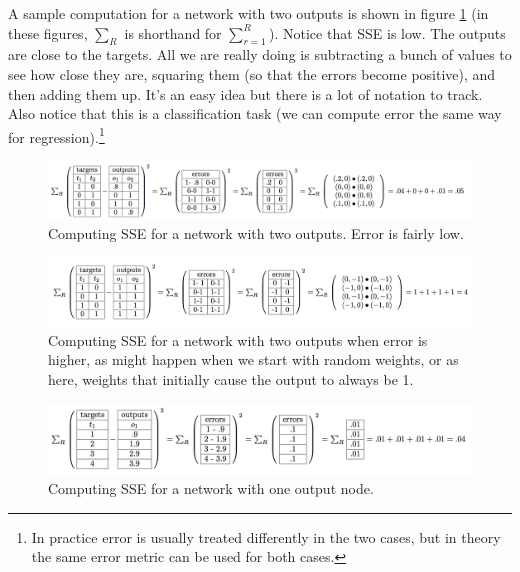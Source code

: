 A sample computation for a network with two outputs is shown in figure \ref{error_computation2_low} (in these figures, $\sum_R$ is shorthand for $\sum_{r=1}^{R}$). Notice that SSE is low. The outputs are close to the targets. All we are really doing is subtracting a bunch of values to see how close they are, squaring them (so that the errors become positive), and then adding them up. It's an easy idea but there is a lot of notation to track. Also notice that this is a classification task (we can compute error the same way for regression).\footnote{In practice error is usually treated differently in the two cases, but in theory the same error metric can be used for both cases.}

\begin{figure}[h]
\centering
\includegraphics[scale=.5]{./images/ErrorComputation_2_low.png}
\caption[Jeff Yoshimi.]{Computing SSE for a network with two outputs. Error is fairly low.}
\label{error_computation2_low}
\end{figure}

\begin{figure}[h]
\centering
\includegraphics[scale=.5]{./images/ErrorComputation_2_high.png}
\caption[Jeff Yoshimi.]{Computing SSE for a network with two outputs when error is higher, as might happen when we start with random weights, or as here, weights that initially cause the output to always be 1.}
\label{error_computation2_high}
\end{figure}

\begin{figure}[h]
\centering
\includegraphics[scale=.5]{./images/ErrorComputation_1.png}
\caption[Jeff Yoshimi.]{Computing SSE for a network with one output node.}
\label{error_computation1}
\end{figure}

